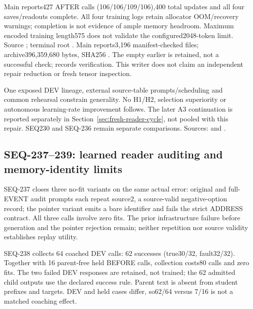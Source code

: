 \documentclass[11pt]{article}
\begin{document}
Main reports427 AFTER calls (106/106/109/106),400 total updates and all four
saves/readouts complete. All four training logs retain allocator OOM/recovery
warnings; completion is not evidence of ample memory headroom. Maximum encoded
training length575 does not validate the configured2048-token limit.
Source ; terminal root
.
Main reports3,196 manifest-checked files; archive396,359,680 bytes, SHA256
.
The empty earlier  is retained, not a successful check;
 records verification. This writer does not claim an
independent repair reduction or fresh tensor inspection.

One exposed DEV lineage, external source-table prompts/scheduling and common
rehearsal constrain generality. No H1/H2, selection superiority or autonomous
learning-rate improvement follows. The later A3 continuation is reported
separately in Section~\ref{sec:fresh-reader-cycle}, not pooled with this repair.
SEQ230 and SEQ-236 remain separate comparisons. Sources:
 and
.

\subsection{SEQ-237--239: learned reader auditing and memory-identity limits}
\label{sec:reader-audit-lesson}

SEQ-237 closes three no-fit variants on the same actual error: original and
full-EVENT audit prompts each repeat source2, a source-valid negative-option
record; the pointer variant emits a bare identifier and fails the strict
ADDRESS contract. All three calls involve zero fits. The prior infrastructure
failure before generation and the pointer rejection remain; neither repetition
nor source validity establishes replay utility.

SEQ-238 collects 64 coached DEV calls: 62 successes (true30/32, fault32/32).
Together with 16 parent-free held BEFORE calls, collection costs80 calls and
zero fits. The two failed DEV responses are retained, not trained; the
62 admitted child outputs use the declared success rule. Parent text is absent
from student prefixes and targets. DEV and held cases differ, so62/64 versus
7/16 is not a matched coaching effect.
\end{document}
